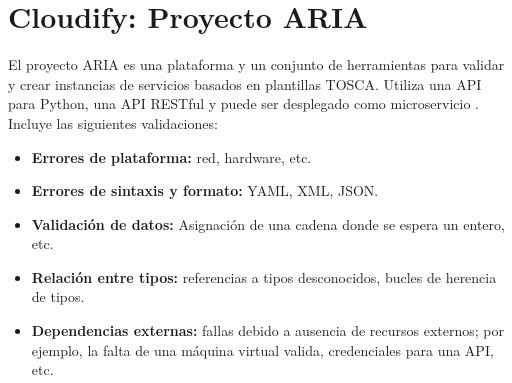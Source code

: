 \chapter{Cloudify: Proyecto ARIA}
El proyecto ARIA es una plataforma y un conjunto de herramientas para validar y crear instancias de servicios basados en plantillas TOSCA. Utiliza una API para Python, una API RESTful y puede ser desplegado como  microservicio \cite{Cloudify2016-cl}.
Incluye las siguientes validaciones:
\begin{itemize}
\item \textbf{Errores de plataforma:} red, hardware, etc.
\item \textbf{Errores de sintaxis y formato:} YAML, XML, JSON.
\item \textbf{Validación de datos:} Asignación de una cadena donde se espera un entero, etc.
\item \textbf{Relación entre tipos:} referencias a tipos desconocidos, bucles de herencia de tipos.
\item \textbf{Dependencias externas:} fallas debido a ausencia de recursos externos; por ejemplo, la falta de una máquina virtual valida, credenciales para una API, etc.

\end{itemize}
